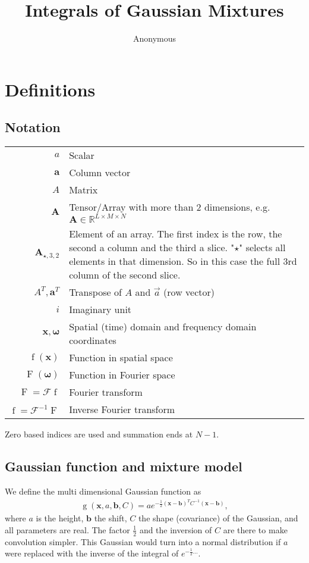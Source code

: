\documentclass{paper}
\title{Integrals of Gaussian Mixtures}
\author{Anonymous}
\newcommand{\F}{\ensuremath{\mathcal{F}}}
\newcommand{\vr}[1]{\ensuremath{\boldsymbol{#1}}}
\newcommand{\tr}[1]{\ensuremath{\boldsymbol{#1}}}
\newcommand{\f}[1]{\operatorname{#1}}
\begin{document}
\maketitle

\section{Definitions}
\subsection*{Notation}
\begin{center}
	\begin{supertabular}{rp{8cm}}
		$a$	& Scalar \\
		$\vr{a}$	& Column vector \\
		$A$			& Matrix \\ 
		$\tr{A}$	& Tensor/Array with more than 2 dimensions, e.g. $\tr{A} \in \mathbb{R}^{L \times M \times N}$ \\ 
		$\tr{A}_{\star, 3, 2}$
					& Element of an array.
					The first index is the row, the second a column and the third a slice.
					"$\star$" selects all elements in that dimension.
					So in this case the full 3rd column of the second slice. \\ 
		$A^T, \vr{a}^T$
					& Transpose of $A$ and $\vec{a}$ (row vector) \\
		$i$			& Imaginary unit \\
		$\vr{x}, \vr{\omega}$
					& Spatial (time) domain and frequency domain coordinates \\
		$\f{f}(\vr{x})$
					& Function in spatial space \\
		$\f{F}(\vr{\omega})$
					& Function in Fourier space \\
		$\f{F} = \F \f{f}$
					& Fourier transform \\
		$\f{f} = \F^{-1} \f{F}$
					& Inverse Fourier transform \\
	\end{supertabular}
\end{center}
Zero based indices are used and summation ends at $N-1$.

\subsection*{Gaussian function and mixture model}
We define the multi dimensional Gaussian function as
\begin{align}
\label{eq:gaussian_definition}
\f{g}(\vr{x}, a, \vr{b}, C) = a e^{-\frac{1}{2}(\vr{x}-\vr{b})^TC^{-1}(\vr{x}-\vr{b})},
\end{align}
where $a$ is the height, $\vr{b}$ the shift, $C$ the shape (covariance) of the Gaussian, and all parameters are real.
The factor $\frac{1}{2}$ and the inversion of $C$ are there to make convolution simpler.
This Gaussian would turn into a normal distribution if $a$ were replaced with the inverse of the integral of $e^{-\frac{1}{2}...}$.
\end{document}
